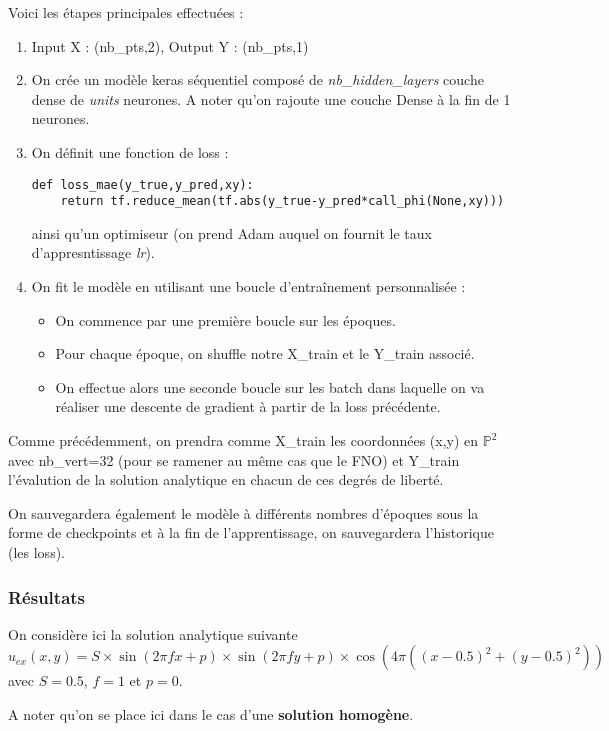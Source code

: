 Voici les étapes principales effectuées :
\begin{enumerate}[label=\textbullet]
	\item Input X : (nb\_pts,2), Output Y : (nb\_pts,1)  
	\item On crée un modèle keras séquentiel composé de \textit{nb\_hidden\_layers} couche dense de \textit{units} neurones. A noter qu'on rajoute une couche Dense à la fin de 1 neurones.
	\item On définit une fonction de loss :
\begin{lstlisting}
def loss_mae(y_true,y_pred,xy):
	return tf.reduce_mean(tf.abs(y_true-y_pred*call_phi(None,xy)))
\end{lstlisting}
	ainsi qu'un optimiseur (on prend Adam auquel on fournit le taux d'appresntissage \textit{lr}).
	\item On fit le modèle en utilisant une boucle d'entraînement personnalisée :
	\begin{itemize}
		\item On commence par une première boucle sur les époques.
		\item Pour chaque époque, on shuffle notre X\_train et le Y\_train associé.
		\item On effectue alors une seconde boucle sur les batch dans laquelle on va réaliser une descente de gradient à partir de la loss précédente.
	\end{itemize}
\end{enumerate}

\begin{Rem}
	Comme précédemment, on prendra comme X\_train les coordonnées (x,y) en $\mathbb{P}^2$ avec nb\_vert=32 (pour se ramener au même cas que le FNO) et Y\_train l'évalution de la solution analytique en chacun de ces degrés de liberté.
	
	On sauvegardera également le modèle à différents nombres d'époques sous la forme de checkpoints et à la fin de l'apprentissage, on sauvegardera l'historique (les loss).
\end{Rem}

\subsubsection{Résultats}

On considère ici la solution analytique suivante
$$u_{ex}(x,y)=S\times\sin(2\pi fx+p)\times\sin(2\pi fy+p)\times\cos(4\pi((x-0.5)^2+(y-0.5)^2))$$
avec $S=0.5$, $f=1$ et $p=0$.

\begin{Rem}
	A noter qu'on se place ici dans le cas d'une \textbf{solution homogène}.
\end{Rem}

